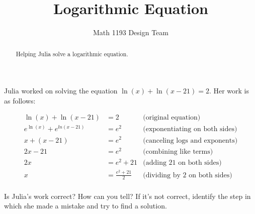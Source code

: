 \documentclass[noauthor]{ximera}
\title{Logarithmic Equation}
\author{Math 1193 Design Team}
\begin{document}
\begin{abstract}
    Helping Julia solve a logarithmic equation.
\end{abstract}
\maketitle

Julia worked on solving the equation \(\ln(x) + \ln(x - 21) = 2\). Her
work is as follows:

\begin{align*}
\ln(x) + \ln(x - 21) & = 2 & \text{(original equation)}\\
e^{\ln(x)} + e^{ln(x - 21)} & = e^2 & \text{(exponentiating on both sides)} \\
x + (x - 21) & = e^2 & \text{(canceling logs and exponents)}\\
2x - 21 & = e^2 & \text{(combining like terms)}\\
2x & = e^2 + 21 & \text{(adding 21 on both sides)}\\
x & = \frac{e^2 + 21}{2} & \text{(dividing by 2 on both sides)}\\
\end{align*}

Is Julia's work correct? How can you tell? If it's not correct, identify
the step in which she made a mistake and try to find a solution.
\end{document}
